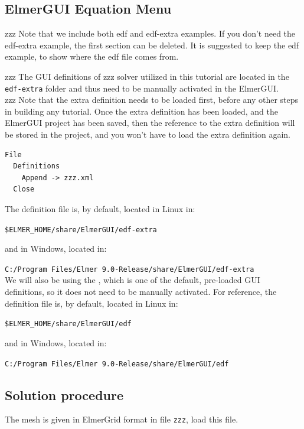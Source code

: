 \subsection*{ElmerGUI Equation Menu}

zzz Note that we include both edf and edf-extra examples.  If you don't need the edf-extra example, the first section can be deleted.  It is suggested to keep the edf example, to show where the edf file comes from.

zzz The GUI definitions of zzz solver utilized in this tutorial are located in the \texttt{edf-extra} folder and thus need to be manually activated in the ElmerGUI.\\

zzz Note that the extra definition needs to be loaded first, before any other steps in building any tutorial.  Once the extra definition has been loaded, and the ElmerGUI project has been saved, then the reference to the extra definition will be stored in the project, and you won't have to load the extra definition again.

\begin{verbatim}
File
  Definitions
    Append -> zzz.xml
  Close
\end{verbatim}

\noindent The \texttt{} definition file is, by default, located in Linux in:

\texttt{\$ELMER\_HOME/share/ElmerGUI/edf-extra}

\noindent and in Windows, located in:

\texttt{C:/Program Files/Elmer 9.0-Release/share/ElmerGUI/edf-extra}\\

We will also be using the , which is one of the default, pre-loaded GUI definitions, so it does not need to be manually activated.  For reference, the  \texttt{} definition file is, by default, located in Linux in:

\texttt{\$ELMER\_HOME/share/ElmerGUI/edf}

\noindent and in Windows, located in:

\texttt{C:/Program Files/Elmer 9.0-Release/share/ElmerGUI/edf}\\


\subsection*{Solution procedure}

The mesh is given in ElmerGrid format in file \texttt{zzz}, load this file.

